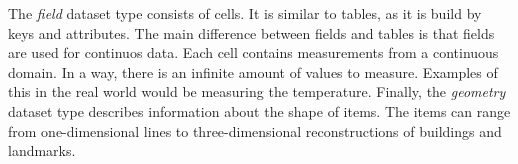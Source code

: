 \documentclass[Report.tex]{subfiles}
\begin{document}
The \emph{field} dataset type consists of cells. It is similar to tables, as it is build by keys and attributes. The main difference between fields and tables is that fields are used for continuos data. Each cell contains measurements from a continuous domain. In a way, there is an infinite amount of values to measure. Examples of this in the real world would be measuring the temperature. 
Finally, the \emph{geometry} dataset type describes information about the shape of items. The items can range from one-dimensional lines to three-dimensional reconstructions of buildings and landmarks.  
\end{document}
